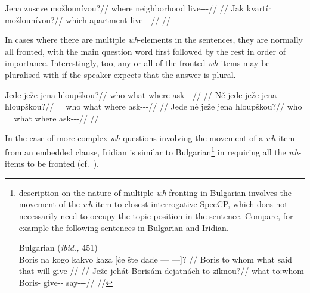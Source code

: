 \pex
\a
\begingl
\gla Jena zuscve možlounívou?//
\glb where neighborhood live-\Lv{}-\Cont{}-\Nz{}//
\glft {}//
\endgl
\a
\begingl
\gla Jak kvartír možlounívou?//
\glb which apartment live-\Lv{}-\Cont{}-\Nz{}//
\glft {}//
\endgl
\xe

In cases where there are multiple \emph{wh}-elements in the sentences, they are normally all fronted, with the main question word first followed by the rest in order of importance. Interestingly, too, any or all of the fronted \emph{wh}-items may be pluralised with  if the speaker expects that the answer is plural.

\pex
\a\begingl
\gla Jede ježe jena hloupškou?//
\glb who what where ask-\Av{}-\Pf{}-\Nz{}//
\glft {}//
\endgl
\a\begingl
\gla Ně jede ježe jena hloupškou?//
\glb \Pl{}= who what where ask-\Av{}-\Pf{}-\Nz{}//
\glft {}//
\endgl
\a\begingl
\gla Jede ně ježe jena hloupškou?//
\glb who \Pl{}= what where ask-\Av{}-\Pf{}-\Nz{}//
\glft {}//
\endgl
\xe

In the case of more complex \emph{wh}-questions involving the movement of a \emph{wh}-item from an embedded clause, Iridian is similar to Bulgarian\footnote{
   description on the nature of multiple \emph{wh}-fronting in Bulgarian involves the movement of the \emph{wh}-item to closest interrogative SpecCP, which does not necessarily need to occupy the topic position in the sentence. Compare, for example the following sentences in Bulgarian and Iridian.

  \ex[lingstyle=fnex,belowexskip=-1em,aboveglftskip=1pt]
  Bulgarian (\emph{ibid.,} 451)\smallskip\\
    \begingl 
    \gla Boris na kogo kakvo kaza [če šte {dade --- ---]}? //
    \glb Boris to whom what said that will give-\Third{}\Sg{}//
    \glft {}//
  \endgl
  \xe
\smallskip
  \ex[lingstyle=fnex,belowexskip=-1em,aboveglftskip=1pt]
    \begingl 
    \gla Ježe jehát Borisám dejatnách to zíknou?//
    \glb what to:whom Boris-\Agt{} give-\Pv{}-\Ctp{} \Rz{} say-\Pv{}-\Pf{}-\Nz{}//
    \glft {}//
  \endgl
  \xe

} in requiring all the \emph{wh}-items to be fronted (cf.~\cite[450]{rudin1988}).

